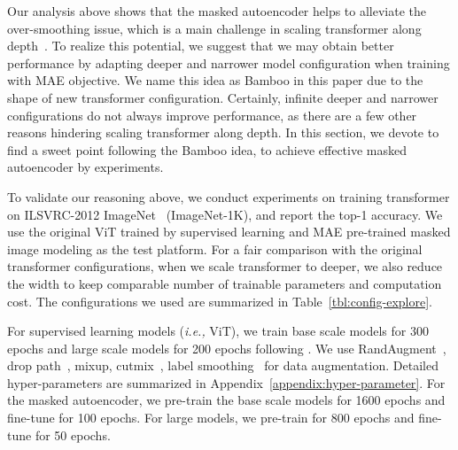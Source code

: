 \documentclass{article}
\theoremstyle{plain}
\theoremstyle{definition}
\theoremstyle{remark}
\newcommand{\ie}{\emph{i.e.,}\xspace}
\begin{document}
Our analysis above shows that the masked autoencoder helps to alleviate the over-smoothing issue, which is a main challenge in scaling transformer along depth~\cite{zhou2021deepvit,dong2021attention}. To realize this potential, we suggest that we may obtain better performance by adapting deeper and narrower model configuration when training with MAE objective. We name this idea as Bamboo in this paper due to the shape of new transformer configuration.
Certainly, infinite deeper and narrower configurations do not always improve performance, as there are a few other reasons hindering scaling transformer along depth. In this section, we devote to find a sweet point following the Bamboo idea, to achieve effective masked autoencoder by experiments.













To validate our reasoning above, we conduct experiments on training transformer on ILSVRC-2012 ImageNet~\citep{deng2009imagenet} (ImageNet-1K), and report the top-1 accuracy. We use the original ViT trained by supervised learning and MAE pre-trained masked image modeling as the test platform. For a fair comparison with the original transformer configurations, when we scale transformer to deeper, we also reduce the width to keep comparable number of trainable parameters and computation cost. The configurations we used are summarized in Table~\ref{tbl:config-explore}.


For supervised learning models (\ie ViT), we train base scale models for 300 epochs and large scale models for 200 epochs following \citet{he2021masked}. We use RandAugment~\citep{cubuk2020randaugment}, drop path~\citep{huang2016deep}, mixup, cutmix~\citep{yun2019cutmix}, label smoothing~\citep{szegedy2016rethinking} for data augmentation.  Detailed hyper-parameters are summarized in Appendix~\ref{appendix:hyper-parameter}. For the masked autoencoder, we pre-train the base scale models for 1600 epochs and fine-tune for 100 epochs. For large models, we pre-train for 800 epochs and fine-tune for 50 epochs.
\end{document}
